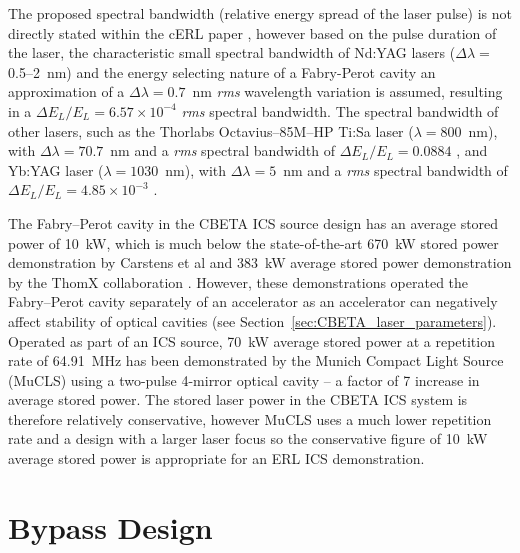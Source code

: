 \documentclass[../main.tex]{subfiles}
\begin{document}
The proposed spectral bandwidth (relative energy spread of the laser pulse) is not directly stated within the cERL paper \cite{akagi2016narrow}, however based on the pulse duration of the laser, the characteristic small spectral bandwidth of Nd:YAG lasers \cite{thorlabs2021ndyag450,thorlabs2021ndyag200} ($\Delta\lambda=$0.5--2~\si{\nano\meter}) and the energy selecting nature of a Fabry-Perot cavity an approximation of a $\Delta \lambda = 0.7$~\si{\nano\meter} \cite{corner2019personal} \textit{rms} wavelength variation is assumed, resulting in a $\Delta E_{L}/E_{L}=6.57\times 10^{-4}$ \textit{rms} spectral bandwidth. The spectral bandwidth of other lasers, such as the Thorlabs Octavius--85M--HP Ti:Sa laser ($\lambda = 800$~\si{\nano\meter}), with $\Delta\lambda=70.7$~\si{\nano\meter} and a \textit{rms} spectral bandwidth of $\Delta E_{L}/E_{L} = 0.0884$ \cite{thorlabs2021tisa}, and Yb:YAG laser ($\lambda=1030$~\si{\nano\meter}), with $\Delta\lambda=5$~\si{\nano\meter} and a \textit{rms} spectral bandwidth of $\Delta E_{L}/E_{L} = 4.85\times 10^{-3}$ \cite{thorlabs2021ybyag}. 

The Fabry--Perot cavity in the CBETA ICS source design has an average stored power of 10~\si{\kilo\watt}, which is much below the state-of-the-art 670~\si{\kilo\watt} stored power demonstration by Carstens et al \cite{carstens2014megawatt} and 383~\si{\kilo\watt} average stored power demonstration by the ThomX collaboration \cite{liu2018optical}. However, these demonstrations operated the Fabry--Perot cavity separately of an accelerator as an accelerator can negatively affect stability of optical cavities (see Section~\ref{sec:CBETA_laser_parameters}). Operated as part of an ICS source, 70~\si{\kilo\watt} average stored power at a repetition rate of 64.91~\si{\mega\hertz} has been demonstrated by the Munich Compact Light Source (MuCLS) \cite{eggl2016munich} using a two-pulse 4-mirror optical cavity -- a factor of 7 increase in average stored power. The stored laser power in the CBETA ICS system is therefore relatively conservative, however MuCLS uses a much lower repetition rate and a design with a larger laser focus so the conservative figure of 10~\si{\kilo\watt} average stored power is appropriate for an ERL ICS demonstration.     

\section{Bypass Design}
\label{sec:bypass_design}
\end{document}
